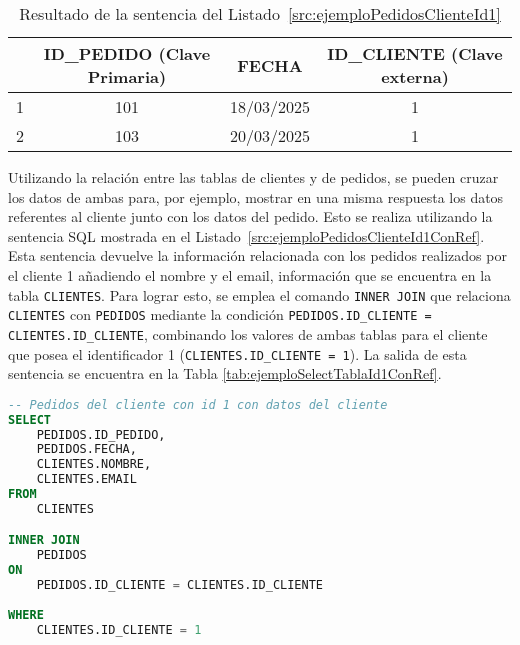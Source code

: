 \begin{table}[H]
\centering
\begin{tabular}{l|c|c|c|}
\cline{2-4}
& \cellcolor[HTML]{C0C0C0}ID\_PEDIDO (\textbf{Clave Primaria}) & \cellcolor[HTML]{C0C0C0}FECHA & \cellcolor[HTML]{C0C0C0}ID\_CLIENTE (\textbf{Clave externa}) \\ \hline
\multicolumn{1}{|l|}{1} & 101                                                 & 18/03/2025                    & 1                                                   \\ \hline
\multicolumn{1}{|l|}{2} & 103                                                 & 20/03/2025                    & 1                                                   \\ \hline
\end{tabular}
\caption{Resultado de la sentencia del Listado~\ref{src:ejemploPedidosClienteId1}}
\label{tab:ejemploTablaSelectId1}
\end{table}

Utilizando la relación entre las tablas de clientes y de pedidos, se pueden cruzar los datos de ambas para, por ejemplo, mostrar en una misma respuesta los datos referentes al cliente junto con los datos del pedido. Esto se realiza utilizando la sentencia SQL mostrada en el Listado~\ref{src:ejemploPedidosClienteId1ConRef}. Esta sentencia devuelve la información relacionada con los pedidos realizados por el cliente 1 añadiendo el nombre y el email, información que se encuentra en la tabla \texttt{CLIENTES}. Para lograr esto, se emplea el comando \texttt{INNER JOIN} que relaciona \texttt{CLIENTES} con \texttt{PEDIDOS} mediante la condición \texttt{PEDIDOS.ID\_CLIENTE = CLIENTES.ID\_CLIENTE}, combinando los valores de ambas tablas para el cliente que posea el identificador 1 (\texttt{CLIENTES.ID\_CLIENTE = 1}). La salida de esta sentencia se encuentra en la Tabla \ref{tab:ejemploSelectTablaId1ConRef}.

\begin{lstlisting}[language=SQL,
                   frame=none,
                   numbers=none,
                   basicstyle=\ttfamily\normalsize,
                   caption={Seleccion de pedidos del cliente 1 con datos cruzados},
                   label=src:ejemploPedidosClienteId1ConRef,
                   inputencoding=utf8]                   
-- Pedidos del cliente con id 1 con datos del cliente
SELECT
    PEDIDOS.ID_PEDIDO,
    PEDIDOS.FECHA,        
    CLIENTES.NOMBRE,
    CLIENTES.EMAIL
FROM 
    CLIENTES

INNER JOIN
    PEDIDOS
ON 
    PEDIDOS.ID_CLIENTE = CLIENTES.ID_CLIENTE
    
WHERE 
    CLIENTES.ID_CLIENTE = 1
\end{lstlisting}

